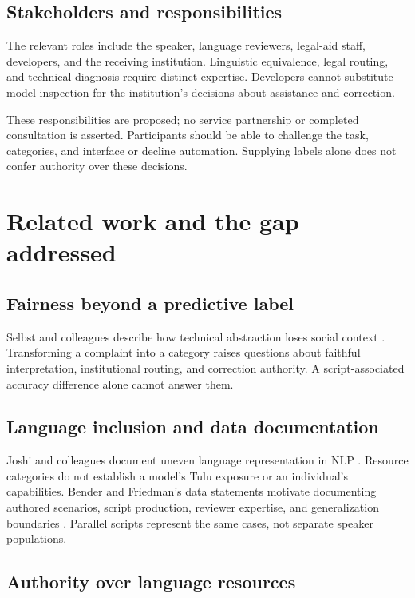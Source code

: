 \documentclass[manuscript,screen,review,anonymous]{acmart}
\begin{document}
\subsection{Stakeholders and responsibilities}

The relevant roles include the speaker, language reviewers, legal-aid staff, developers, and the receiving institution. Linguistic equivalence, legal routing, and technical diagnosis require distinct expertise. Developers cannot substitute model inspection for the institution's decisions about assistance and correction.

These responsibilities are proposed; no service partnership or completed consultation is asserted. Participants should be able to challenge the task, categories, and interface or decline automation. Supplying labels alone does not confer authority over these decisions.

\section{Related work and the gap addressed}

\subsection{Fairness beyond a predictive label}

Selbst and colleagues describe how technical abstraction loses social context \cite{selbst}. Transforming a complaint into a category raises questions about faithful interpretation, institutional routing, and correction authority. A script-associated accuracy difference alone cannot answer them.

\subsection{Language inclusion and data documentation}

Joshi and colleagues document uneven language representation in NLP \cite{joshi}. Resource categories do not establish a model's Tulu exposure or an individual's capabilities. Bender and Friedman's data statements motivate documenting authored scenarios, script production, reviewer expertise, and generalization boundaries \cite{bender}. Parallel scripts represent the same cases, not separate speaker populations.

\subsection{Authority over language resources}
\end{document}
